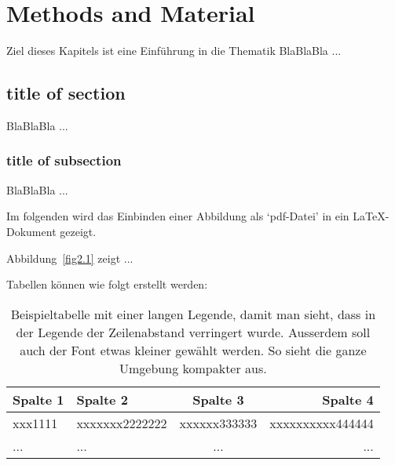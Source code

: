 
\chapter{Methods and Material}
  \label{MetMat}

\noindent
Ziel dieses Kapitels ist eine Einf\"uhrung in die Thematik BlaBlaBla ...

\section{title of section}
  \label{Abschnittslabel} 

BlaBlaBla ...

\subsection{title of subsection}
  \label{Unterabschnittslabel}

BlaBlaBla ...

Im folgenden wird das Einbinden einer Abbildung als `pdf-Datei' in ein
\LaTeX-Dokument gezeigt.


Abbildung~\ref{fig2.1} zeigt ...

Tabellen k\"onnen wie folgt erstellt werden:

{
\renewcommand{\baselinestretch}{0.9} 
\normalsize
\begin{table}[htb]
\begin{tabular}{|p{2.7cm}||l|c|r|}
\hline
    \textbf{Spalte 1} 
  & \textbf{Spalte 2} 
  & \textbf{Spalte 3} 
  & \textbf{Spalte 4} \\
  \hline\hline
  xxx1111
  & xxxxxxx2222222
  & xxxxxx333333 
  & xxxxxxxxxx444444 \\
  \hline
    ...
  & ...
  & ...
  & ...\\
  \hline
\end{tabular}
  \caption[Beispieltabelle mit einer langen Legende]{Beispieltabelle mit einer langen Legende, damit man sieht, dass in der Legende der Zeilenabstand verringert wurde. Ausserdem soll auch der Font etwas kleiner gew\"ahlt werden. So sieht die ganze Umgebung kompakter aus.}
  \label{tabelle-1}
\end{table}
}

